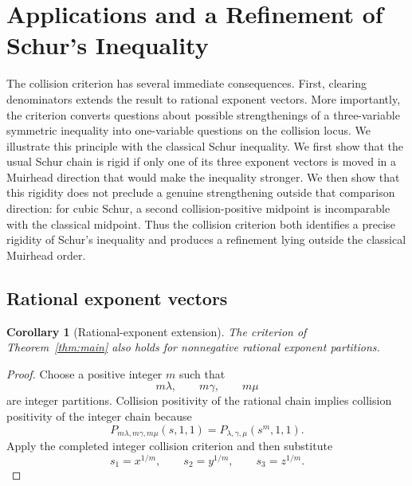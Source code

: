 \documentclass[11pt]{article}
\newtheorem{corollary}[theorem]{Corollary}
\theoremstyle{definition}
\begin{document}
\section{Applications and a Refinement of Schur's Inequality}

The collision criterion has several immediate consequences.  First, clearing denominators extends the result to rational exponent vectors.  More importantly, the criterion converts questions about possible strengthenings of a three-variable symmetric inequality into one-variable questions on the collision locus.  We illustrate this principle with the classical Schur inequality.  We first show that the usual Schur chain is rigid if only one of its three exponent vectors is moved in a Muirhead direction that would make the inequality stronger.  We then show that this rigidity does not preclude a genuine strengthening outside that comparison direction: for cubic Schur, a second collision-positive midpoint is incomparable with the classical midpoint.  Thus the collision criterion both identifies a precise rigidity of Schur's inequality and produces a refinement lying outside the classical Muirhead order.

\subsection{Rational exponent vectors}

\begin{corollary}[Rational-exponent extension]\label{cor:rational}
The criterion of Theorem~\ref{thm:main} also holds for nonnegative rational exponent partitions.
\end{corollary}

\begin{proof}
Choose a positive integer \(m\) such that
\begin{equation*}
m\lambda,
\qquad
m\gamma,
\qquad
m\mu
\end{equation*}
are integer partitions.  Collision positivity of the rational chain implies collision positivity of the integer chain because
\begin{equation*}
P_{m\lambda,m\gamma,m\mu}(s,1,1)
=P_{\lambda,\gamma,\mu}(s^m,1,1).
\end{equation*}
Apply the completed integer collision criterion and then substitute
\begin{equation*}
s_1=x^{1/m},
\qquad
s_2=y^{1/m},
\qquad
s_3=z^{1/m}.
\end{equation*}
\end{proof}
\end{document}
